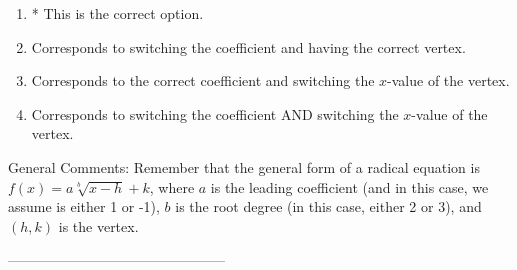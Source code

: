 \documentclass{extbook}[14pt]
\begin{document}
\begin{enumerate}[label=\Alph*.] 
\item * This is the correct option.  
\item Corresponds to switching the coefficient and having the correct vertex.  
\item Corresponds to the correct coefficient and switching the $x$-value of the vertex.  
\item Corresponds to switching the coefficient AND switching the $x$-value of the vertex.  
\end{enumerate} 
 
General Comments: Remember that the general form of a radical equation is $ f(x) = a \sqrt[b]{x - h} + k $, where $a$ is the leading coefficient (and in this case, we assume is either 1 or -1), $b$ is the root degree (in this case, either 2 or 3), and $(h, k)$ is the vertex.

-----------------------------------------------
\end{document}

